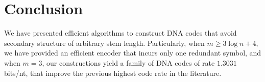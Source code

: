 \documentclass[conference]{IEEEtran}
\theoremstyle{plain}
\newtheorem{theorem}{Theorem}
\theoremstyle{definition}
\newcommand{\D}{{\mathcal D}}
\newcommand{\bx}{{\mathbfsl{x}}}
\renewcommand{\ge}{\geqslant}
\newcommand{\enc}{\textsc{Enc}}
\begin{document}

\section{Conclusion}

We have presented efficient algorithms to construct DNA codes that avoid secondary structure of arbitrary stem length. Particularly, when $m\ge 3 \log n + 4$, we have provided an efficient encoder that incurs only one redundant symbol, and when $m = 3$, our constructions yield a family of DNA codes of rate $1.3031$ bits/nt, that improve the previous highest code rate in the literature. %
\end{document}
